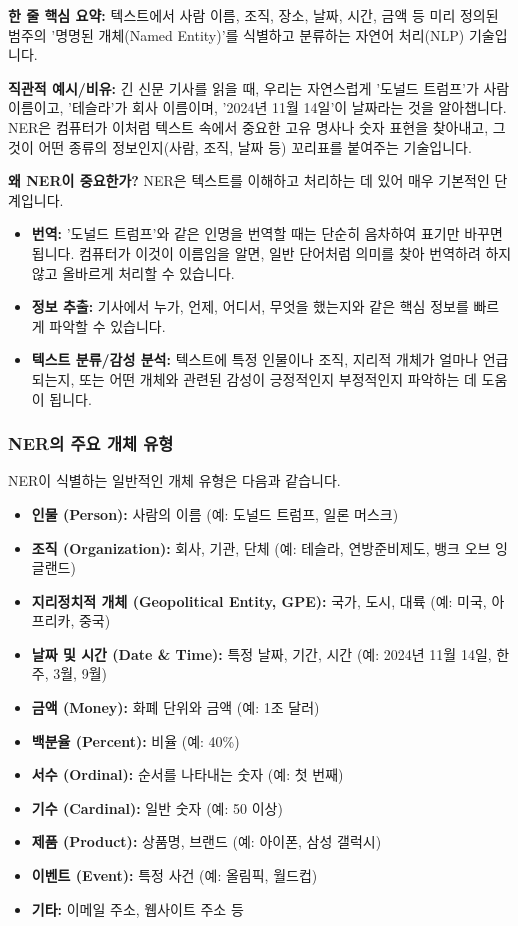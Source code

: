 \documentclass[11pt,a4paper]{article}
\theoremstyle{definition}
\begin{document}
\begin{conceptbox}
\textbf{한 줄 핵심 요약:} 텍스트에서 사람 이름, 조직, 장소, 날짜, 시간, 금액 등 미리 정의된 범주의 '명명된 개체(Named Entity)'를 식별하고 분류하는 자연어 처리(NLP) 기술입니다.
\end{conceptbox}

\textbf{직관적 예시/비유:}
긴 신문 기사를 읽을 때, 우리는 자연스럽게 '도널드 트럼프'가 사람 이름이고, '테슬라'가 회사 이름이며, '2024년 11월 14일'이 날짜라는 것을 알아챕니다. NER은 컴퓨터가 이처럼 텍스트 속에서 중요한 고유 명사나 숫자 표현을 찾아내고, 그것이 어떤 종류의 정보인지(사람, 조직, 날짜 등) 꼬리표를 붙여주는 기술입니다.

\textbf{왜 NER이 중요한가?}
NER은 텍스트를 이해하고 처리하는 데 있어 매우 기본적인 단계입니다.
\begin{itemize}
    \item \textbf{번역:} '도널드 트럼프'와 같은 인명을 번역할 때는 단순히 음차하여 표기만 바꾸면 됩니다. 컴퓨터가 이것이 이름임을 알면, 일반 단어처럼 의미를 찾아 번역하려 하지 않고 올바르게 처리할 수 있습니다.
    \item \textbf{정보 추출:} 기사에서 누가, 언제, 어디서, 무엇을 했는지와 같은 핵심 정보를 빠르게 파악할 수 있습니다.
    \item \textbf{텍스트 분류/감성 분석:} 텍스트에 특정 인물이나 조직, 지리적 개체가 얼마나 언급되는지, 또는 어떤 개체와 관련된 감성이 긍정적인지 부정적인지 파악하는 데 도움이 됩니다.
\end{itemize}

\subsubsection*{NER의 주요 개체 유형}
NER이 식별하는 일반적인 개체 유형은 다음과 같습니다.
\begin{itemize}
    \item \textbf{인물 (Person):} 사람의 이름 (예: 도널드 트럼프, 일론 머스크)
    \item \textbf{조직 (Organization):} 회사, 기관, 단체 (예: 테슬라, 연방준비제도, 뱅크 오브 잉글랜드)
    \item \textbf{지리정치적 개체 (Geopolitical Entity, GPE):} 국가, 도시, 대륙 (예: 미국, 아프리카, 중국)
    \item \textbf{날짜 및 시간 (Date \& Time):} 특정 날짜, 기간, 시간 (예: 2024년 11월 14일, 한 주, 3월, 9월)
    \item \textbf{금액 (Money):} 화폐 단위와 금액 (예: 1조 달러)
    \item \textbf{백분율 (Percent):} 비율 (예: 40\%)
    \item \textbf{서수 (Ordinal):} 순서를 나타내는 숫자 (예: 첫 번째)
    \item \textbf{기수 (Cardinal):} 일반 숫자 (예: 50 이상)
    \item \textbf{제품 (Product):} 상품명, 브랜드 (예: 아이폰, 삼성 갤럭시)
    \item \textbf{이벤트 (Event):} 특정 사건 (예: 올림픽, 월드컵)
\item \textbf{기타:} 이메일 주소, 웹사이트 주소 등
\end{itemize}
\end{document}
